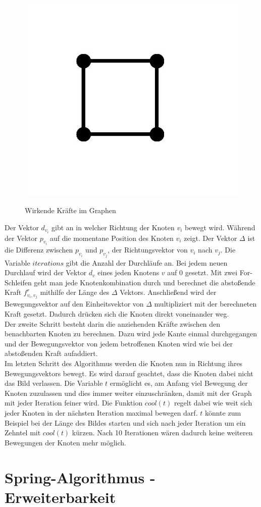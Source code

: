 \begin{figure}[t]
	{\includegraphics[scale=0.3]{bilder/standardgraph}\label{fig_standardgraph}
	}
	\\
	\caption[Wirkende Kräfte im Graphen]{Wirkende Kräfte im Graphen}
	\label{fig_testbild2}
\end{figure} 


Der Vektor $d_{v_{i}}$ gibt an in welcher Richtung der Knoten $v_{i}$ bewegt wird. Während der Vektor $p_{v_{i}}$ auf die momentane Position des Knoten $v_{i}$ zeigt. Der Vektor $\Delta$ ist die Differenz zwischen $p_{v_{i}}$ und $p_{v_{j}}$, der Richtungsvektor von $v_{i}$ nach $v_{j}$. Die Variable $iterations$ gibt die Anzahl der Durchläufe an. Bei jedem neuen Durchlauf wird der Vektor  $d_{v}$  eines jeden Knotens $v$ auf 0 gesetzt. Mit zwei For-Schleifen geht man jede Knotenkombination durch und berechnet die abstoßende Kraft $f^{r}_{v_{i},v_{j}}$ mithilfe der Länge des $\Delta$ Vektors. Anschließend wird der Bewegungsvektor auf den Einheitsvektor von $\Delta$ multipliziert mit der berechneten Kraft gesetzt. Dadurch drücken sich die Knoten direkt voneinander weg. \\

Der zweite Schritt besteht darin die anziehenden Kräfte zwischen den benachbarten Knoten zu berechnen. Dazu wird jede Kante einmal durchgegangen und der Bewegungsvektor von jedem betroffenen Knoten wird wie bei der abstoßenden Kraft aufaddiert. \\

Im letzten Schritt des Algorithmus werden die Knoten nun in Richtung ihres Bewegungsvektors bewegt. Es wird darauf geachtet, dass die Knoten dabei nicht das Bild verlassen. Die Variable $t$ ermöglicht es, am Anfang viel Bewegung der Knoten zuzulassen und dies immer weiter einzuschränken, damit mit der Graph mit jeder Iteration feiner wird. Die Funktion $cool(t)$ regelt dabei wie weit sich jeder Knoten in der nächsten Iteration maximal bewegen darf. $t$ könnte zum Beispiel bei der Länge des Bildes starten und sich nach jeder Iteration um ein Zehntel mit $cool(t)$ kürzen. Nach 10 Iterationen wären dadurch keine weiteren Bewegungen der Knoten mehr möglich.


\section{Spring-Algorithmus - Erweiterbarkeit}
\label{Kapitel_3_-_Unterkapitel_3}   
%